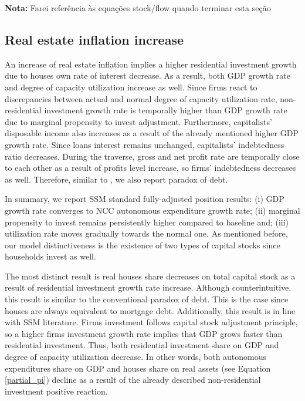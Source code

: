 \documentclass[11pt]{article}
\begin{document}
\textbf{Nota:} Farei referência às equações stock/flow quando terminar esta seção

\subsection{Real estate inflation increase}
\label{sec:org58b3bba}
\label{sec:Exp2}


An increase of real estate inflation implies a higher residential investment growth due to houses own rate of interest decrease.
As a result, both GDP growth rate and degree of capacity utilization increase as well.
Since firms react to discrepancies between actual and normal degree of capacity utilization rate, non-residential investment growth rate 
is temporally higher than GDP growth rate due to marginal propensity to invest adjustment.
Furthermore, capitalists' disposable income also increases as a result of the already mentioned higher GDP growth rate.
Since loans interest remains unchanged, capitalists' indebtedness ratio decreases.
During the traverse, gross and net profit rate are temporally close to each other as a result of profits level increase, so firms' indebtedness decreases as well.
Therefore, similar to \textcite{mandarino-2020-worker-debt}, we also report paradox of debt.

In summary, we report SSM standard fully-adjusted position results:
    (i) GDP growth rate converges to NCC autonomous expenditure growth rate;
    (ii) marginal propensity to invest remains persistently higher compared to baseline and;
    (iii) utilization rate moves gradually towards the normal one.
As mentioned before, our model distinctiveness is the existence of two types of capital stocks since households invest as well.


The most distinct result is real houses share decreases on total capital stock as a result of residential investment growth rate increase.
Although counterintuitive, this result is similar to the conventional paradox of debt.
This is the case since houses are always equivalent to  mortgage debt.
Additionally, this result is in line with SSM literature.
Firms investment follows capital stock adjustment principle, so a higher firms investment growth rate implies that
GDP grows faster than residential investment.
Thus, both residential investment share on GDP and degree of capacity  utilization decrease.
In other words, both autonomous expenditures share on GDP and houses share on real assets (see Equation \ref{partial_pi}) decline as a result of the already described non-residential investment positive reaction.
\end{document}
